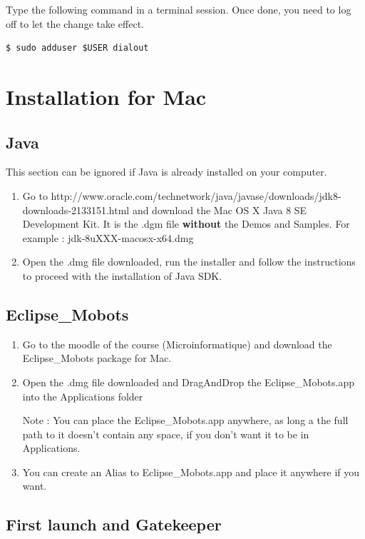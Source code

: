 \documentclass[a4paper]{article}
\begin{document}
Type the following command in a terminal session. Once done, you need to log off to let the change take effect.

\begin{lstlisting}
$ sudo adduser $USER dialout
\end{lstlisting}

\newpage
\section{Installation for Mac}

\subsection{Java}
This section can be ignored if Java is already installed on your computer.

\begin{enumerate}
\item Go to http://www.oracle.com/technetwork/java/javase/downloads/jdk8-downloads-2133151.html and download the Mac OS X Java 8 SE Development Kit. It is the .dgm file \textbf{without} the Demos and Samples.
For example : jdk-8uXXX-macosx-x64.dmg
\item Open the .dmg file downloaded, run the installer and follow the instructions to proceed with the installation of Java SDK.
\end{enumerate}


\subsection{Eclipse\_Mobots}

\begin{enumerate}
\item Go to the moodle of the course (Microinformatique) and download the Eclipse\_Mobots package for Mac.
\item Open the .dmg file downloaded and DragAndDrop the Eclipse\_Mobots.app into the Applications folder

Note : You can place the Eclipse\_Mobots.app anywhere, as long a the full path to it doesn't contain any space, if you don't want it to be in Applications.
\item You can create an Alias to Eclipse\_Mobots.app and place it anywhere if you want.
\end{enumerate}

\subsection{First launch and Gatekeeper}
\end{document}
